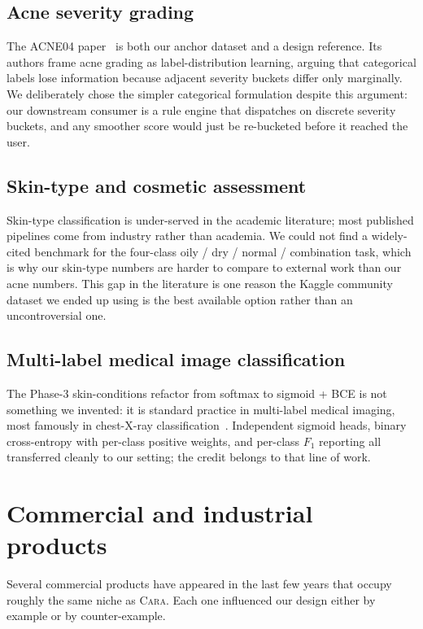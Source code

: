\documentclass[11pt,a4paper,oneside]{report}
\newcommand{\cara}{\textsc{Cara}\xspace}
\begin{document}
\subsection{Acne severity grading}
The ACNE04 paper~\cite{wu2019acne04} is both our anchor dataset and
a design reference. Its authors frame acne grading as label-distribution
learning, arguing that categorical labels lose information because
adjacent severity buckets differ only marginally. We deliberately
chose the simpler categorical formulation despite this argument: our
downstream consumer is a rule engine that dispatches on discrete
severity buckets, and any smoother score would just be re-bucketed
before it reached the user.

\subsection{Skin-type and cosmetic assessment}
Skin-type classification is under-served in the academic literature;
most published pipelines come from industry rather than academia.
We could not find a widely-cited benchmark for the four-class
oily / dry / normal / combination task, which is why our skin-type
numbers are harder to compare to external work than our acne numbers.
This gap in the literature is one reason the Kaggle community dataset
we ended up using is the best available option rather than an
uncontroversial one.

\subsection{Multi-label medical image classification}
The Phase-3 skin-conditions refactor from softmax to sigmoid + BCE
is not something we invented: it is standard practice in multi-label
medical imaging, most famously in chest-X-ray
classification~\cite{rajpurkar2017chexnet}. Independent sigmoid heads,
binary cross-entropy with per-class positive weights, and per-class
\(F_1\) reporting all transferred cleanly to our setting; the credit
belongs to that line of work.

\section{Commercial and industrial products}

Several commercial products have appeared in the last few years that
occupy roughly the same niche as \cara. Each one influenced our design
either by example or by counter-example.
\end{document}
